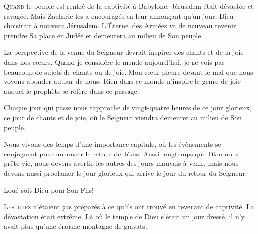\lettrine{Q}{uand} le peuple est rentré de la captivité à Babylone,
 Jérusalem était dévastée et ravagée. Mais Zacharie les a encouragés
 en leur annon\c{c}ant qu'un jour, Dieu choisirait à nouveau Jérusalem.
 L'Éternel des Armées va de nouveau revenir prendre Sa place en Judée
 et demeurera au milieu de Son peuple. 


La perspective de la venue du Seigneur devrait inspirer des chants
 et de la joie dans nos c\oe{}urs. Quand je considère le monde aujourd'hui,
 je ne vois pas beaucoup de sujets de chants ou de joie.
 Mon c\oe{}ur pleure devant le mal que nous voyons abonder autour de nous.
 Rien dans ce monde n'inspire le genre de joie auquel le prophète
 se réfère dans ce passage. 

Chaque jour qui passe nous rapproche de vingt-quatre heures de ce jour
 glorieux, ce jour de chants et de joie, où le Seigneur viendra demeurer
 au milieu de Son peuple. 

Nous vivons des temps d'une importance capitale, où les évènements
 se conjuguent pour annoncer le retour de Jésus. Aussi longtemps que Dieu
 nous prête vie, nous devons avertir les autres des jours mauvais à venir,
 mais nous devons aussi proclamer le jour glorieux qui arrive
 \ocadr le jour du retour du Seigneur. 

Loué soit Dieu pour Son Fils! 

\dvrule






\lettrine{L}{es juifs} n'étaient pas préparés à ce qu'ils ont trouvé
 en revenant de captivité. La dévastation était extrême.
 Là où le temple de Dieu s'était un jour dressé,
 il n'y avait plus qu'une énorme montagne de gravats. 

